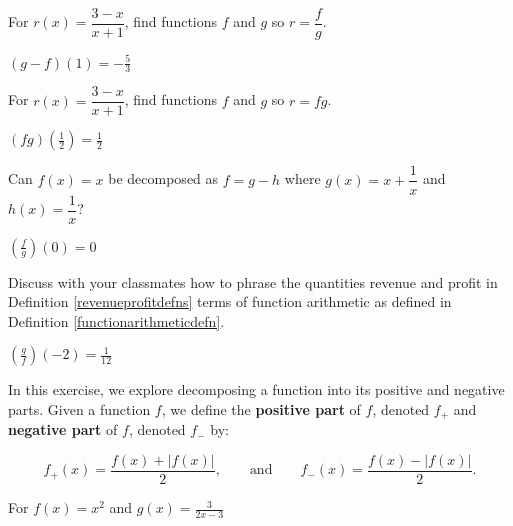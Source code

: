 \documentclass{ximera}
\begin{document}
\begin{question}
For $r(x) = \dfrac{3-x}{x+1}$, find functions $f$ and $g$ so $r = \dfrac{f}{g}$.
\begin{solution}
$(g-f)(1) = -\frac{5}{3}$

\end{solution}

\end{question}

\begin{question}
For $r(x) = \dfrac{3-x}{x+1}$, find functions $f$ and $g$ so $r = fg$. 

\begin{solution}
$(fg)\left(\frac{1}{2}\right) = \frac{1}{2}$
\end{solution}

\end{question}

\begin{question}
Can $f(x) = x$ be decomposed as $f = g-h$ where $g(x) = x+\dfrac{1}{x}$ and $h(x) = \dfrac{1}{x}$?
\begin{solution}
$\left(\frac{f}{g}\right)(0) = 0$
\end{solution}

\end{question}

\begin{question}
Discuss with your classmates how to phrase the quantities revenue and profit in Definition \ref{revenueprofitdefns} terms of function arithmetic as defined in Definition \ref{functionarithmeticdefn}.
 
\begin{solution}
$\left(\frac{g}{f}\right)\left(-2\right) = \frac{1}{12}$

\end{solution}

\end{question}

\begin{question}
In this exercise, we explore decomposing a function into its positive and negative parts.  Given a function $f$, we define the \textbf{positive part} of $f$, denoted $f_{+}$ and \textbf{negative part} of $f$, denoted $f_{-}$ by:

\[ f_{+}(x) = \dfrac{f(x) + |f(x)|}{2}, \qquad \text{and} \qquad f_{-}(x) = \dfrac{f(x) - |f(x)|}{2}. \]

\begin{solution}
For  $f(x) = x^2$ and $g(x) = \frac{3}{2x-3}$


\end{solution}

\end{question}
\end{document}
